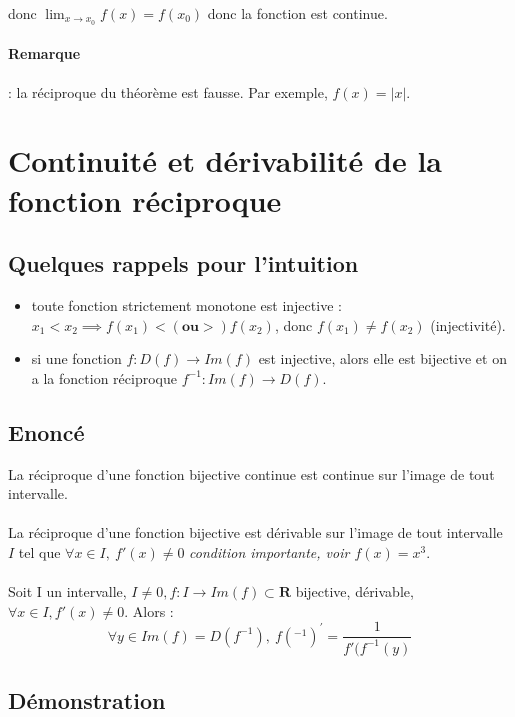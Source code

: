 \documentclass{article}
\begin{document}
donc $ \lim_{x\to{x_0}} f(x) = f(x_0) $ donc la fonction est continue.
\paragraph{Remarque}: la réciproque du théorème est fausse. Par exemple, $ f(x) = |x| $.

\newpage

\section{Continuité et dérivabilité de la fonction réciproque}

\subsection{Quelques rappels pour l'intuition}


\begin{itemize}
    \item toute fonction strictement monotone est injective :\\
$ x_1 < x_2 \implies f(x_1) < (\textbf{ou} >) f(x_2) $, donc $ f(x_1) \neq f(x_2) $ (injectivité).
    \item si une fonction $ f: D(f) \to Im(f) $ est injective, alors elle est bijective et on a la fonction réciproque $ f^{-1} : Im(f) \to D(f) $.
\end{itemize}

\subsection{Enoncé}

La réciproque d'une fonction bijective continue est continue sur l'image de tout intervalle.\\\\
La réciproque d'une fonction bijective  est dérivable sur l'image de tout intervalle $ I $ tel que $ \forall x \in I,\ f'(x) \neq 0 $ \textit{condition importante, voir $ f(x) = x^3 $}.\\\\
Soit I un intervalle, $ I \neq 0, f : I \to Im(f) \subset \mathbf{R} $ bijective, dérivable, $ \forall x \in I, f'(x) \neq 0 $. Alors :
\[ \forall y \in Im(f) = D(f^{-1}),\ f(^{-1})^{'} = \frac{1}{f'(f^{-1}(y)} \]

\subsection{Démonstration}
\end{document}
